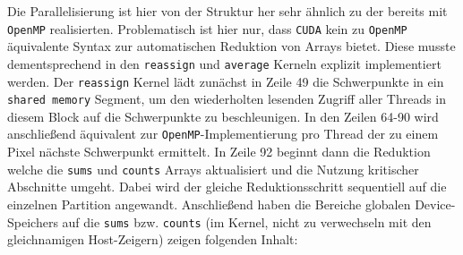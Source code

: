 \documentclass[
    bibliography=totoc, cd=lightcolor, cdmath=false, ngerman]{tudscrreprt}
\DeclarePairedDelimiter\ceil{\lceil}{\rceil}
\begin{document}
Die Parallelisierung ist hier von der Struktur her sehr ähnlich zu der bereits
mit \texttt{OpenMP} realisierten. Problematisch ist hier nur, dass
\texttt{CUDA} kein zu \texttt{OpenMP} äquivalente Syntax zur automatischen
Reduktion von Arrays bietet. Diese musste dementsprechend in
den \texttt{reassign} und \texttt{average} Kerneln explizit implementiert
werden.
Der \texttt{reassign} Kernel lädt zunächst in Zeile 49 die Schwerpunkte in ein
\texttt{shared memory} Segment, um den wiederholten lesenden Zugriff aller
Threads in diesem Block auf die Schwerpunkte zu beschleunigen. In den Zeilen
64-90 wird anschließend äquivalent zur \texttt{OpenMP}-Implementierung pro
Thread der zu einem Pixel nächste Schwerpunkt ermittelt. In Zeile 92 beginnt
dann die Reduktion welche die \texttt{sums} und \texttt{counts} Arrays
aktualisiert und die Nutzung kritischer Abschnitte umgeht. Dabei wird der
gleiche Reduktionsschritt sequentiell auf die einzelnen Partition angewandt.
Anschließend haben die Bereiche globalen Device-Speichers auf die \texttt{sums}
bzw. \texttt{counts} (im Kernel, nicht zu verwechseln mit den gleichnamigen
Host-Zeigern) zeigen folgenden Inhalt:

\vspace{10pt}


\end{document}
